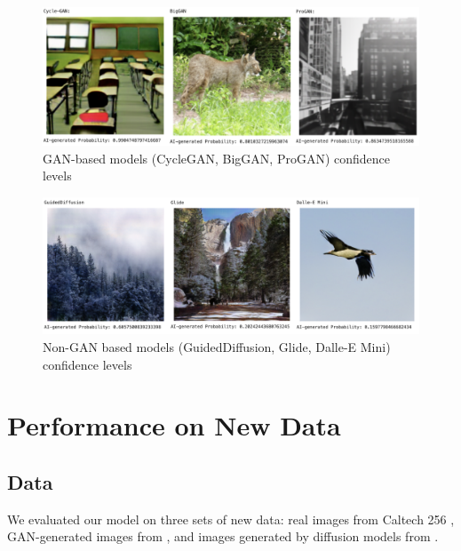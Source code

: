 \documentclass{article} %
\begin{document}
\begin{figure}[h]
    \begin{center}
        \includegraphics[scale=0.4]{figs/GAN_Confidence.png}
    \end{center}
    \caption{GAN-based models (CycleGAN, BigGAN, ProGAN) confidence levels}
    \label{fig:Gan_Conf}
\end{figure}
\begin{figure}[h]
    \begin{center}
        \includegraphics[scale=0.45]{figs/non-GAN_Confidence.png}
    \end{center}
    \caption{Non-GAN based models (GuidedDiffusion, Glide, Dalle-E Mini) confidence levels}
    \label{fig:non-Gan_Conf}
\end{figure}


\section{Performance on New Data}

\subsection{Data}

We evaluated our model on three sets of new data: real images from Caltech 256 \citep{griffinholubperona2022}, GAN-generated images from \citet{chuangchuangtanGANGenDetection}, and images generated by diffusion models from \citet{stable-diffusion-100k-custom-prompts-and-images}.
\end{document}
